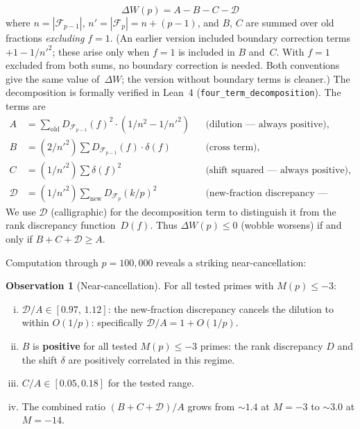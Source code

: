 \documentclass[11pt]{article}
\theoremstyle{definition}
\newtheorem{observation}[theorem]{Observation}
\newcommand{\F}{\mathcal{F}}
\begin{document}
\begin{equation}
  \Delta W(p) = A - B - C - \mathcal{D}
\end{equation}
where $n = |\F_{p-1}|$, $n' = |\F_p| = n + (p-1)$, and
$B$, $C$ are summed over old fractions \emph{excluding}
$f = 1$.  (An earlier version included boundary correction
terms $+1 - 1/{n'}^2$; these arise only when $f = 1$ is
included in $B$ and~$C$.  With $f = 1$ excluded from both
sums, no boundary correction is needed.  Both conventions
give the same value of~$\Delta W$; the version without
boundary terms is cleaner.)
The decomposition is formally verified
in Lean~4 (\texttt{four\_term\_decomposition}).  The
terms are
\begin{align*}
  A &= \textstyle\sum_{\text{old}} D_{\F_{p-1}}(f)^2 \cdot
       (1/n^2 - 1/{n'}^2) && \text{(dilution --- always positive),}\\
  B &= (2/{n'}^2)\textstyle\sum D_{\F_{p-1}}(f) \cdot \delta(f)
       && \text{(cross term),}\\
  C &= (1/{n'}^2)\textstyle\sum \delta(f)^2
       && \text{(shift squared --- always positive),}\\
  \mathcal{D} &= (1/{n'}^2)\textstyle\sum_{\text{new}} D_{\F_p}(k/p)^2
       && \text{(new-fraction discrepancy --- always positive).}
\end{align*}
We use $\mathcal{D}$ (calligraphic) for the decomposition term to
distinguish it from the rank discrepancy function~$D(f)$.
Thus $\Delta W(p) \le 0$ (wobble worsens) if and only if
$B + C + \mathcal{D} \ge A$.

Computation through $p = 100{,}000$ reveals a striking near-cancellation:

\begin{observation}[Near-cancellation]
For all tested primes with $M(p) \le -3$:
\begin{enumerate}[(i)]
  \item $\mathcal{D}/A \in [0.97,\, 1.12]$: the new-fraction discrepancy cancels the dilution
    to within $O(1/p)$: specifically $\mathcal{D}/A = 1 + O(1/p)$.
  \item $B$ is \textbf{positive} for all tested $M(p) \le -3$ primes:
    the rank discrepancy $D$ and
    the shift $\delta$ are positively correlated in this regime.
  \item $C/A \in [0.05, 0.18]$ for the tested range.
  \item The combined ratio $(B + C + \mathcal{D})/A$ grows from ${\sim}1.4$ at
    $M = -3$ to ${\sim}3.0$ at $M = -14$.
\end{enumerate}
\end{observation}
\end{document}
